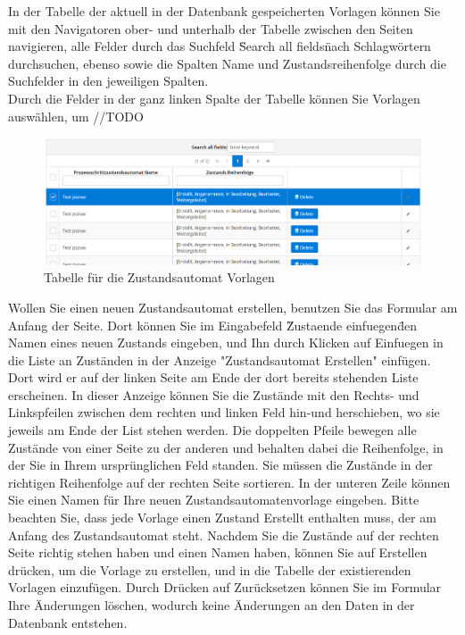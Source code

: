 \documentclass[enabledeprecatedfontcommands,fontsize=12pt,paper=a4,twoside]{scrartcl}
\begin{document}
In der Tabelle der aktuell in der Datenbank gespeicherten Vorlagen können Sie mit den Navigatoren ober- und unterhalb der Tabelle zwischen den Seiten navigieren, alle Felder durch das Suchfeld \"Search all fields\" nach Schlagwörtern durchsuchen, ebenso sowie die Spalten Name und Zustandsreihenfolge durch die Suchfelder in den jeweiligen Spalten. \\
Durch die Felder in der ganz linken Spalte der Tabelle können Sie Vorlagen auswählen, um //TODO \\

\begin{figure}[h!]
\begin{center}
 \includegraphics[width=\textwidth]{screenshots/pk/zustandsautomattabelle.png}
  \caption{Tabelle für die Zustandsautomat Vorlagen}
  \label{fig:boat2}
\end{center}
\end{figure}

Wollen Sie einen neuen Zustandsautomat erstellen, benutzen Sie das Formular am Anfang der Seite. Dort können Sie im Eingabefeld \"Zustaende einfuegen\" den Namen eines neuen Zustands eingeben, und Ihn durch Klicken auf Einfuegen in die Liste an Zuständen in der Anzeige "Zustandsautomat Erstellen" einfügen. Dort wird er auf der linken Seite am Ende der dort bereits stehenden Liste erscheinen. In dieser Anzeige können Sie die Zustände mit den Rechts- und Linkspfeilen zwischen dem rechten und linken Feld hin-und herschieben, wo sie jeweils am Ende der List stehen werden. Die doppelten Pfeile bewegen alle Zustände von einer Seite zu der anderen und behalten dabei die Reihenfolge, in der Sie in Ihrem ursprünglichen Feld standen. Sie müssen die Zustände in der richtigen Reihenfolge auf der rechten Seite sortieren. In der unteren Zeile können Sie einen Namen für Ihre neuen Zustandsautomatenvorlage eingeben. Bitte beachten Sie, dass jede Vorlage einen Zustand Erstellt enthalten muss, der am Anfang des Zustandsautomat steht. 
Nachdem Sie die Zustände auf der rechten Seite richtig stehen haben und einen Namen haben, können Sie auf Erstellen drücken, um die Vorlage zu erstellen, und in die Tabelle der existierenden Vorlagen einzufügen. Durch Drücken auf Zurücksetzen können Sie im Formular Ihre Änderungen löschen, wodurch keine Änderungen an den Daten in der Datenbank entstehen. \\
\end{document}
